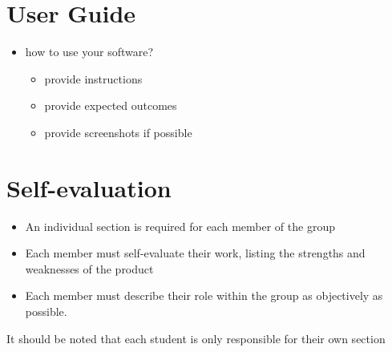 \documentclass{scrartcl}
\begin{document}
\section{User Guide}\label{user-guide}

\begin{itemize}
      \item how to use your software?

            \begin{itemize}
                  \item provide instructions
                  \item provide expected outcomes
                  \item provide screenshots if possible
            \end{itemize}
\end{itemize}

\section{Self-evaluation}\label{self-evaluation}

\begin{itemize}
      \item An individual section is required for each member of the group
      \item Each member must self-evaluate their work, listing the strengths and
            weaknesses of the product
      \item Each member must describe their role within the group as objectively
            as possible.
\end{itemize}

It should be noted that each student is only responsible for their own
section


\cite{adams1995hitchhiker} %
\end{document}
